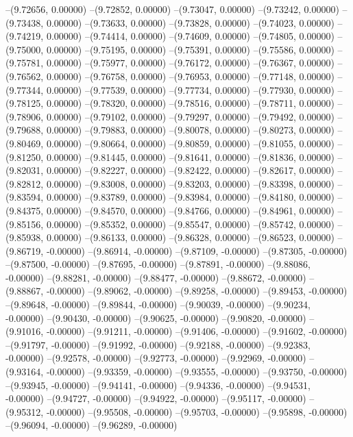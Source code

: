 --(9.72656, 0.00000)
--(9.72852, 0.00000)
--(9.73047, 0.00000)
--(9.73242, 0.00000)
--(9.73438, 0.00000)
--(9.73633, 0.00000)
--(9.73828, 0.00000)
--(9.74023, 0.00000)
--(9.74219, 0.00000)
--(9.74414, 0.00000)
--(9.74609, 0.00000)
--(9.74805, 0.00000)
--(9.75000, 0.00000)
--(9.75195, 0.00000)
--(9.75391, 0.00000)
--(9.75586, 0.00000)
--(9.75781, 0.00000)
--(9.75977, 0.00000)
--(9.76172, 0.00000)
--(9.76367, 0.00000)
--(9.76562, 0.00000)
--(9.76758, 0.00000)
--(9.76953, 0.00000)
--(9.77148, 0.00000)
--(9.77344, 0.00000)
--(9.77539, 0.00000)
--(9.77734, 0.00000)
--(9.77930, 0.00000)
--(9.78125, 0.00000)
--(9.78320, 0.00000)
--(9.78516, 0.00000)
--(9.78711, 0.00000)
--(9.78906, 0.00000)
--(9.79102, 0.00000)
--(9.79297, 0.00000)
--(9.79492, 0.00000)
--(9.79688, 0.00000)
--(9.79883, 0.00000)
--(9.80078, 0.00000)
--(9.80273, 0.00000)
--(9.80469, 0.00000)
--(9.80664, 0.00000)
--(9.80859, 0.00000)
--(9.81055, 0.00000)
--(9.81250, 0.00000)
--(9.81445, 0.00000)
--(9.81641, 0.00000)
--(9.81836, 0.00000)
--(9.82031, 0.00000)
--(9.82227, 0.00000)
--(9.82422, 0.00000)
--(9.82617, 0.00000)
--(9.82812, 0.00000)
--(9.83008, 0.00000)
--(9.83203, 0.00000)
--(9.83398, 0.00000)
--(9.83594, 0.00000)
--(9.83789, 0.00000)
--(9.83984, 0.00000)
--(9.84180, 0.00000)
--(9.84375, 0.00000)
--(9.84570, 0.00000)
--(9.84766, 0.00000)
--(9.84961, 0.00000)
--(9.85156, 0.00000)
--(9.85352, 0.00000)
--(9.85547, 0.00000)
--(9.85742, 0.00000)
--(9.85938, 0.00000)
--(9.86133, 0.00000)
--(9.86328, 0.00000)
--(9.86523, 0.00000)
--(9.86719, -0.00000)
--(9.86914, -0.00000)
--(9.87109, -0.00000)
--(9.87305, -0.00000)
--(9.87500, -0.00000)
--(9.87695, -0.00000)
--(9.87891, -0.00000)
--(9.88086, -0.00000)
--(9.88281, -0.00000)
--(9.88477, -0.00000)
--(9.88672, -0.00000)
--(9.88867, -0.00000)
--(9.89062, -0.00000)
--(9.89258, -0.00000)
--(9.89453, -0.00000)
--(9.89648, -0.00000)
--(9.89844, -0.00000)
--(9.90039, -0.00000)
--(9.90234, -0.00000)
--(9.90430, -0.00000)
--(9.90625, -0.00000)
--(9.90820, -0.00000)
--(9.91016, -0.00000)
--(9.91211, -0.00000)
--(9.91406, -0.00000)
--(9.91602, -0.00000)
--(9.91797, -0.00000)
--(9.91992, -0.00000)
--(9.92188, -0.00000)
--(9.92383, -0.00000)
--(9.92578, -0.00000)
--(9.92773, -0.00000)
--(9.92969, -0.00000)
--(9.93164, -0.00000)
--(9.93359, -0.00000)
--(9.93555, -0.00000)
--(9.93750, -0.00000)
--(9.93945, -0.00000)
--(9.94141, -0.00000)
--(9.94336, -0.00000)
--(9.94531, -0.00000)
--(9.94727, -0.00000)
--(9.94922, -0.00000)
--(9.95117, -0.00000)
--(9.95312, -0.00000)
--(9.95508, -0.00000)
--(9.95703, -0.00000)
--(9.95898, -0.00000)
--(9.96094, -0.00000)
--(9.96289, -0.00000)
